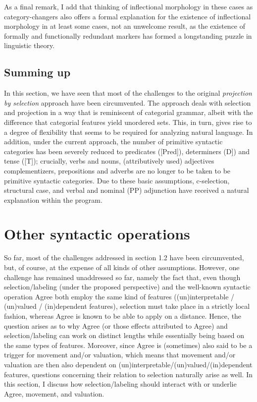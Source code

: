 \documentclass[output=paper
,modfonts
,nonflat]{langsci/langscibook}
\begin{document}
As a final remark, I add that thinking of inflectional morphology in these cases as category-changers also offers a formal explanation for the existence of inflectional morphology in at least some cases, not an unwelcome result, as the existence of formally and functionally redundant markers has formed a longstanding puzzle in linguistic theory.

\subsection{Summing up}
In this section, we have seen that most of the challenges to the original \textit{projection by selection} approach have been circumvented. The approach deals with selection and projection in a way that is reminiscent of categorial grammar, albeit with the difference that categorial features yield unordered sets. This, in turn, gives rise to a degree of flexibility that seems to be required for analyzing natural language. In addition, under the current approach, the number of primitive syntactic categories has been severely reduced to predicates ([Pred]), determiners (D]) and tense ([T]); crucially, verbs and nouns, (attributively used) adjectives complementizers, prepositions and adverbs are no longer to be taken to be primitive syntactic categories. Due to these basic assumptions, c-selection, structural case, and verbal and nominal (PP) adjunction have received a natural explanation within the program.

\section{Other syntactic operations}
So far, most of the challenges addressed in section 1.2 have been circumvented, but, of course, at the expense of all kinds of other assumptions. However, one challenge has remained unaddressed so far, namely the fact that, even though selection/labeling (under the proposed perspective) and the well-known syntactic operation Agree both employ the same kind of features ((un)interpretable / (un)valued / (in)dependent features), selection must take place in a strictly local fashion, whereas Agree is known to be able to apply on a distance. Hence, the question arises as to why Agree (or those effects attributed to Agree) and selection/labeling can work on distinct lengths while essentially being based on the same types of features. Moreover, since Agree is (sometimes) also said to be a trigger for movement and/or valuation, which means that movement and/or valuation are then also dependent on (un)interpretable/(un)valued/(in)dependent features, questions concerning their relation to selection naturally arise as well. In this section, I discuss how selection/labeling should interact with or underlie Agree, movement, and valuation.
\end{document}
